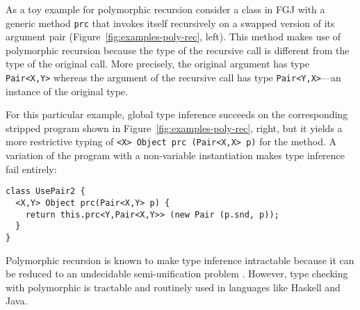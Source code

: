 As a toy example for polymorphic recursion consider a class in FGJ with a
generic method \texttt{prc} that invokes itself
recursively on a swapped version of its argument pair
(Figure~\ref{fig:examples-poly-rec}, left).
This method makes use of polymorphic recursion because the type of the
recursive call is different from the type of the original call. More
precisely, the original argument has type \texttt{Pair<X,Y>} whereas
the argument of the recursive call has type
\texttt{Pair<Y,X>}---an instance of the original type.

For this particular example, global type inference succeeds on the
corresponding stripped program shown in
Figure~\ref{fig:examples-poly-rec}, right, but it yields a more restrictive
typing of \texttt{<X> Object prc (Pair<X,X> p)} for the method. 
A variation of the program with a non-variable instantiation makes type inference fail entirely:
\begin{lstlisting}
class UsePair2 {
  <X,Y> Object prc(Pair<X,Y> p) {
    return this.prc<Y,Pair<X,Y>> (new Pair (p.snd, p));
  }
}
\end{lstlisting}



Polymorphic recursion is known to make type inference intractable
\cite{DBLP:journals/toplas/Henglein93,DBLP:journals/toplas/KfouryTU93}
because it can be reduced to an undecidable semi-unification problem
\cite{DBLP:journals/iandc/KfouryTU93}. However, type checking with
polymorphic is tractable and routinely used in languages like Haskell
and Java.



